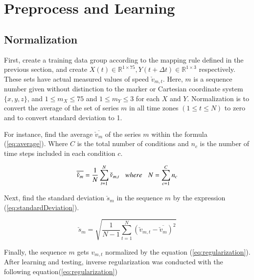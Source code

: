 \documentclass{sigchi}
\begin{document}
\section{Preprocess and Learning}

\subsection{Normalization}

First, create a training data group according to the mapping rule defined in the previous section, and create $ X (t) \in \mathbb {R} ^ {1 \times 75}, Y (t + \Delta t) \in \mathbb {R} ^ {1 \times 3} $ respectively. These sets have actual measured values of speed $ \check {v}_{m, t} $. Here, $ m $ is a sequence number given without distinction to the marker or Cartesian coordinate system $ \{x, y, z \} $, and $ 1 \leq m_X \leq 75$ and $ 1 \leq m_Y \leq 3 $ for each $ X $ and $ Y $. Normalization is to convert the average of the set of series $ m $ in all time zones $ (1 \leq t \leq N) $ to zero and to convert standard deviation to 1.

For instance, find the average $ \overline {\check {v}_{m}} $ of the series $ m $ within the formula (\ref{eq:average}). Where $ C $ is the total number of conditions and $ n_c $ is the number of time steps included in each condition $ c $.

\begin{equation}
\overline{\check{v}_{m}} = \frac{1}{N}\sum^{N}_{t=1}\check{v}_{m,t} 
 \hspace{3mm} where  \hspace{3mm}
N=\sum^{C}_{c=1} n_c 
\label{eq:average}
\end{equation}

Next, find the standard deviation $ \check {s}_m $ in the sequence $ m $ by the expression (\ref{eq:standardDeviation}).

\begin{equation}
  \check{s}_m = \sqrt{ \frac{1}{N-1}\sum^{N}_{t=1} ( \check{v}_{m,t} - \overline{\check{v}_m} ) ^2} 			
\label{eq:standardDeviation}
\end{equation}

Finally, the sequence $ m $ gets $ v_{m, t} $ normalized by the equation (\ref{eq:regularization}).
After learning and testing, inverse regularization was conducted with the following equation(\ref{eq:regularization}) 
\end{document}
